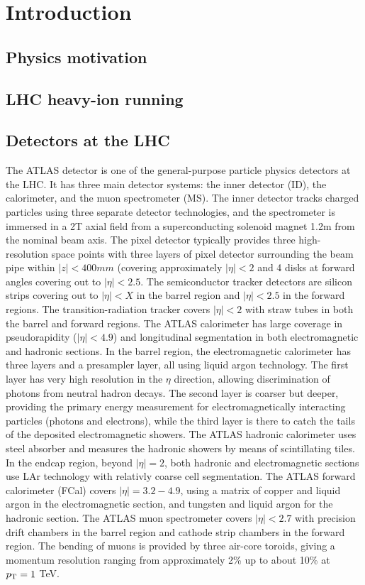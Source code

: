 \section{Introduction}
\label{secall:intro}
\subsection{Physics motivation}
\label{subsecall:motivation}
\subsection{LHC heavy-ion running}
\label{subsecall:running}
\subsection{Detectors at the LHC}
\label{subsecall:detectors}

The ATLAS detector is one of the general-purpose particle physics
detectors at the LHC.  
It has three main detector systems: the inner detector (ID), the calorimeter,
and the muon spectrometer (MS).
%
The inner detector tracks charged particles using three separate detector
technologies, and the spectrometer is immersed in a 2T axial field from a 
superconducting solenoid magnet 1.2m from the nominal beam axis.
The pixel detector typically provides three high-resolution space points
with three layers of pixel detector surrounding the beam pipe within
$|z|<400 mm$ (covering approximately $|\eta|<2$ and 4 disks at forward
angles covering out to $|\eta|<2.5$.
The semiconductor tracker detectors are silicon strips covering out to
$|\eta|<X$ in the barrel region and $|\eta|<2.5$ in the forward regions.
The transition-radiation tracker covers $|\eta|<2$ with straw tubes in
both the barrel and forward regions.
%
The ATLAS calorimeter has large coverage in pseudorapidity ($|\eta|<4.9$)
and longitudinal segmentation in both electromagnetic and hadronic
sections.
In the barrel region, the electromagnetic calorimeter has three
layers and a presampler layer, all using liquid argon technology.  
The first layer has very high resolution
in the $\eta$ direction, allowing discrimination of photons from
neutral hadron decays.
The second layer is coarser but deeper, providing the primary energy
measurement for electromagnetically interacting particles (photons and
electrons), while the third layer is there to catch the tails of the
deposited electromagnetic showers.
%
The ATLAS hadronic calorimeter uses steel absorber and measures the
hadronic showers by means of scintillating tiles.
In the endcap region, beyond $|\eta|=2$, 
both hadronic and electromagnetic sections use LAr technology with
relativly coarse cell segmentation.
The ATLAS forward calorimeter (FCal) covers $|\eta|=3.2-4.9$, using
a matrix of copper and liquid argon in the electromagnetic section,
and tungsten and liquid argon for the hadronic section.
%
The ATLAS muon spectrometer covers $|\eta|<2.7$ with precision drift
chambers
in the barrel region and cathode strip chambers in the forward region.
The bending of muons is provided by three air-core toroids, giving
a momentum resolution ranging from approximately 2\% up to about
10\% at $\mbox{$p_{\mathrm{T}}$}=1$ TeV.
%

